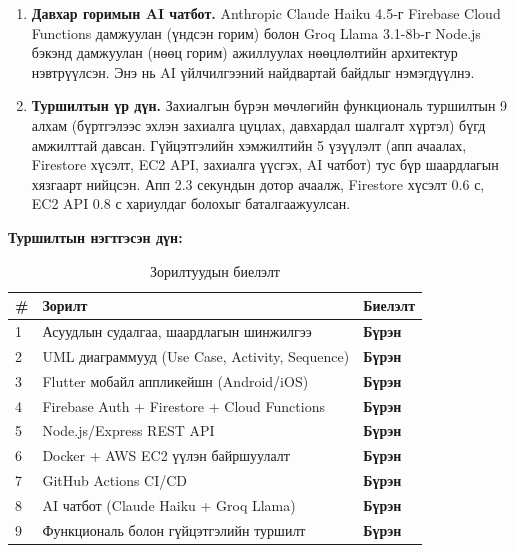 \begin{enumerate}
    \item \textbf{Давхар горимын AI чатбот.} Anthropic Claude Haiku 4.5-г Firebase Cloud Functions дамжуулан (үндсэн горим) болон Groq Llama 3.1-8b-г Node.js бэкэнд дамжуулан (нөөц горим) ажиллуулах нөөцлөлтийн архитектур нэвтрүүлсэн. Энэ нь AI үйлчилгээний найдвартай байдлыг нэмэгдүүлнэ.

    \item \textbf{Туршилтын үр дүн.} Захиалгын бүрэн мөчлөгийн функциональ туршилтын 9 алхам (бүртгэлээс эхлэн захиалга цуцлах, давхардал шалгалт хүртэл) бүгд амжилттай давсан. Гүйцэтгэлийн хэмжилтийн 5 үзүүлэлт (апп ачаалах, Firestore хүсэлт, EC2 API, захиалга үүсгэх, AI чатбот) тус бүр шаардлагын хязгаарт нийцсэн. Апп 2.3 секундын дотор ачаалж, Firestore хүсэлт 0.6 с, EC2 API 0.8 с хариулдаг болохыг баталгаажуулсан.
\end{enumerate}

\textbf{Туршилтын нэгтгэсэн дүн:}

\begin{table}[h]
\centering
\caption{Зорилтуудын биелэлт}
\label{tab:goals}
\begin{tabularx}{\textwidth}{|p{0.4cm}|X|p{2.5cm}|}
\hline
\textbf{\#} & \textbf{Зорилт} & \textbf{Биелэлт} \\
\hline
1 & Асуудлын судалгаа, шаардлагын шинжилгээ & \textcolor{green!60!black}{\textbf{Бүрэн}} \\
\hline
2 & UML диаграммууд (Use Case, Activity, Sequence) & \textcolor{green!60!black}{\textbf{Бүрэн}} \\
\hline
3 & Flutter мобайл аппликейшн (Android/iOS) & \textcolor{green!60!black}{\textbf{Бүрэн}} \\
\hline
4 & Firebase Auth + Firestore + Cloud Functions & \textcolor{green!60!black}{\textbf{Бүрэн}} \\
\hline
5 & Node.js/Express REST API & \textcolor{green!60!black}{\textbf{Бүрэн}} \\
\hline
6 & Docker + AWS EC2 үүлэн байршуулалт & \textcolor{green!60!black}{\textbf{Бүрэн}} \\
\hline
7 & GitHub Actions CI/CD & \textcolor{green!60!black}{\textbf{Бүрэн}} \\
\hline
8 & AI чатбот (Claude Haiku + Groq Llama) & \textcolor{green!60!black}{\textbf{Бүрэн}} \\
\hline
9 & Функциональ болон гүйцэтгэлийн туршилт & \textcolor{green!60!black}{\textbf{Бүрэн}} \\
\hline
\end{tabularx}
\end{table}

